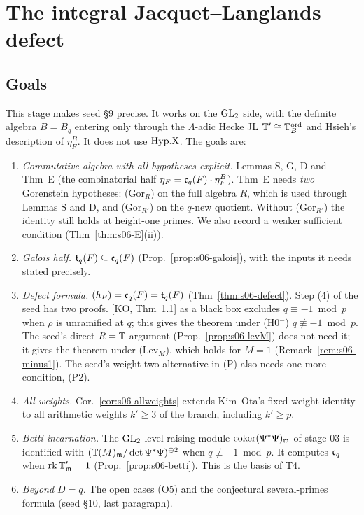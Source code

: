 \section{The integral Jacquet--Langlands defect}\label{sec:stage-06}
\providecommand{\BG}{\mathrm{BG}}          %

\subsection{Goals}
This stage makes seed \S9 precise. It works on the $\mathrm{GL}_2$ side, with the definite algebra $B=B_q$ entering only through the
$\Lambda$-adic Hecke JL $\mathbb{T}'\cong\mathbb{T}^{\mathrm{ord}}_{B}$ and Hsieh's description of $\eta^B_F$. It does not use $\mathrm{Hyp.X}$. The goals are:
\begin{enumerate}[label=(G\arabic*)]
\item \emph{Commutative algebra with all hypotheses explicit.} Lemmas S, G, D and Thm~E (the combinatorial half
  $\eta_F=\mathfrak{c}_q(F)\cdot\eta^B_F$). Thm~E needs \emph{two} Gorenstein hypotheses: (Gor$_R$) on the full algebra $R$, which is used
  through Lemmas S and D, and (Gor$_{R'}$) on the $q$-new quotient. Without (Gor$_{R'}$) the identity still holds at height-one primes.
  We also record a weaker sufficient condition (Thm~\ref{thm:s06-E}(ii)).
\item \emph{Galois half.} $\mathfrak{t}_q(F)\subseteq\mathfrak{c}_q(F)$ (Prop.~\ref{prop:s06-galois}), with the inputs it needs stated precisely.
\item \emph{Defect formula.} $(h_F)=\mathfrak{c}_q(F)=\mathfrak{t}_q(F)$ (Thm~\ref{thm:s06-defect}). Step (4) of the seed has two proofs.
  [KO, Thm~1.1] as a black box excludes $q\equiv-1\bmod p$ when $\bar\rho$ is unramified at $q$; this gives the theorem under
  (H0$^-$) $q\not\equiv-1\bmod p$. The seed's direct $R=\mathbb{T}$ argument (Prop.~\ref{prop:s06-levM}) does not need it; it gives the
  theorem under (Lev$_M$), which holds for $M=1$ (Remark~\ref{rem:s06-minus1}). The seed's weight-two alternative in (P) also needs
  one more condition, (P2).
\item \emph{All weights.} Cor.~\ref{cor:s06-allweights} extends Kim--Ota's fixed-weight identity to all arithmetic weights $k'\ge3$
  of the branch, including $k'\ge p$.
\item \emph{Betti incarnation.} The $\mathrm{GL}_2$ level-raising module $\operatorname{coker}(\Psi^*\Psi)_{\mathfrak{m}}$ of stage 03 is identified with
  $(\mathbb{T}(M)_{\mathfrak{m}}/\det\Psi^*\Psi)^{\oplus2}$ when $q\not\equiv-1\bmod p$. It computes $\mathfrak{c}_q$ when $\operatorname{rk}\mathbb{T}'_{\mathfrak{m}}=1$ (Prop.~\ref{prop:s06-betti}).
  This is the basis of T4.
\item \emph{Beyond $D=q$.} The open cases (O5) and the conjectural several-primes formula (seed \S10, last paragraph).
\end{enumerate}

